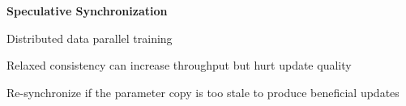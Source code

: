 \documentclass[12pt]{article}
\renewcommand{\section}[2]%
        {\pagebreak[2]\vspace{1.3\baselineskip}%
         \phantomsection\addcontentsline{toc}{section}{#1}%
         \hspace{0in}%
         \marginpar{
         \raggedright \scshape #1}#2}
\newenvironment{innerlist}[1][\textbullet]%
        {\begin{compactenum}[#1]}{\end{compactenum}}
\begin{document}
\textbf{Speculative Synchronization}
\vspace{2pt}
\begin{compactenum}[-]
\item Distributed data parallel training
\item Relaxed consistency can increase throughput but hurt update quality
\item Re-synchronize if the parameter copy is too stale to produce beneficial updates
\end{compactenum}



\end{document}
